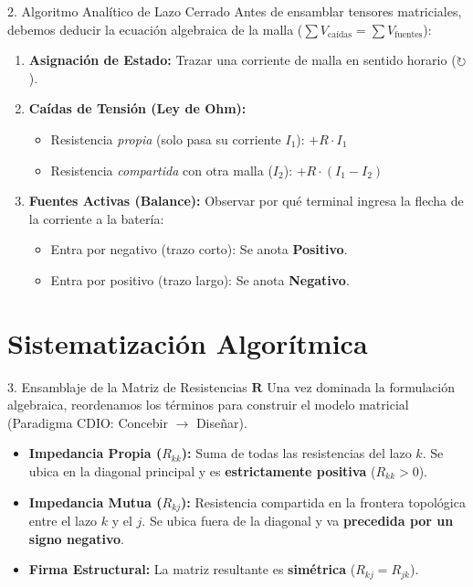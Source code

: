 \documentclass[aspectratio=169]{beamer}
\begin{document}
\begin{frame}{2. Algoritmo Analítico de Lazo Cerrado}
    Antes de ensamblar tensores matriciales, debemos deducir la ecuación algebraica de la malla ($\sum V_{\text{caídas}} = \sum V_{\text{fuentes}}$):
    
    \vspace{0.2cm}
    \begin{enumerate}
        \item \textbf{Asignación de Estado:} Trazar una corriente de malla en sentido horario ($\circlearrowright$).
        \item \textbf{Caídas de Tensión (Ley de Ohm):}
        \begin{itemize}
            \item Resistencia \textit{propia} (solo pasa su corriente $I_1$): $+ R \cdot I_1$
            \item Resistencia \textit{compartida} con otra malla ($I_2$): $+ R \cdot (I_1 - I_2)$
        \end{itemize}
        \item \textbf{Fuentes Activas (Balance):} Observar por qué terminal ingresa la flecha de la corriente a la batería:
        \begin{itemize}
            \item Entra por negativo (trazo corto): Se anota \textbf{Positivo}.
            \item Entra por positivo (trazo largo): Se anota \textbf{Negativo}.
        \end{itemize}
    \end{enumerate}
\end{frame}

\section{Sistematización Algorítmica}

\begin{frame}{3. Ensamblaje de la Matriz de Resistencias $\mathbf{R}$}
    Una vez dominada la formulación algebraica, reordenamos los términos para construir el modelo matricial (Paradigma CDIO: Concebir $\rightarrow$ Diseñar).
    
    \vspace{0.3cm}
    \begin{tcolorbox}[colback=white,colframe=UCBblue,title=Reglas Topológicas Directas]
    \begin{itemize}
        \item \textbf{Impedancia Propia ($R_{kk}$):} Suma de todas las resistencias del lazo $k$. Se ubica en la diagonal principal y es \textbf{estrictamente positiva} ($R_{kk} > 0$).
        \item \textbf{Impedancia Mutua ($R_{kj}$):} Resistencia compartida en la frontera topológica entre el lazo $k$ y el $j$. Se ubica fuera de la diagonal y va \textbf{precedida por un signo negativo}.
        \item \textbf{Firma Estructural:} La matriz resultante es \textbf{simétrica} ($R_{kj} = R_{jk}$).
    \end{itemize}
    \end{tcolorbox}
\end{frame}
\end{document}
